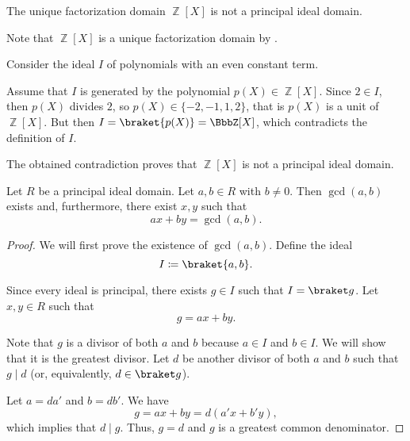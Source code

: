 \begin{example}\label{thm:ufd_is_not_pid}\cite{ProofWiki:polynomials_in_integers_is_not_principal_ideal_domain}
  The unique factorization domain \( \BbbZ[X] \) is not a principal ideal domain.

  Note that \( \BbbZ[X] \) is a unique factorization domain by .

  Consider the ideal \( I \) of polynomials with an even constant term.

  Assume that \( I \) is generated by the polynomial \( p(X) \in \BbbZ[X] \). Since \( 2 \in I \), then \( p(X) \) divides \( 2 \), so \( p(X) \in \{ -2, -1, 1, 2 \} \), that is \( p(X) \) is a unit of \( \BbbZ[X] \). But then \( I = \braket{p(X)} = \BbbZ[X] \), which contradicts the definition of \( I \).

  The obtained contradiction proves that \( \BbbZ[X] \) is not a principal ideal domain.
\end{example}

\begin{theorem}\label{thm:bezout_identity}
  Let \( R \) be a principal ideal domain. Let \( a, b \in R \) with \( b \neq 0 \). Then \( \gcd(a, b) \) exists and, furthermore, there exist \( x, y \) such that
  \begin{equation*}
    ax + by = \gcd(a, b).
  \end{equation*}
\end{theorem}
\begin{proof}
  We will first prove the existence of \( \gcd(a, b) \). Define the ideal
  \begin{equation*}
    I \coloneqq \braket{a, b}.
  \end{equation*}

  Since every ideal is principal, there exists \( g \in I \) such that \( I = \braket g \). Let \( x, y \in R \) such that
  \begin{equation*}
    g = ax + by.
  \end{equation*}

  Note that \( g \) is a divisor of both \( a \) and \( b \) because \( a \in I \) and \( b \in I \). We will show that it is the greatest divisor. Let \( d \) be another divisor of both \( a \) and \( b \) such that \( g \mid d \) (or, equivalently, \( d \in \braket g \)).

  Let \( a = da' \) and \( b = db' \). We have
  \begin{equation*}
    g = ax + by = d(a'x + b'y),
  \end{equation*}
  which implies that \( d \mid g \). Thus, \( g = d \) and \( g \) is a greatest common denominator.
\end{proof}

